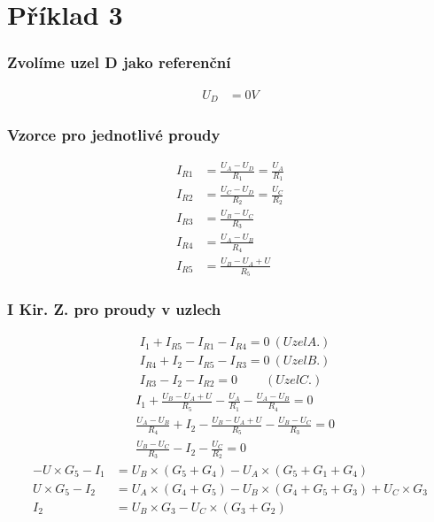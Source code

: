 \section{Příklad 3}
\subsubsection{Zvolíme uzel D jako referenční}
\begin{align*}
U_D &= 0 V
\end{align*}
\subsubsection{Vzorce pro jednotlivé proudy}
\begin{align*}
I_{R1} &= \frac {U_A - U_D} {R_1} = \frac {U_A} {R_1}\\
I_{R2} &= \frac {U_C - U_D} {R_2} = \frac {U_C} {R_2}\\
I_{R3} &= \frac {U_B - U_C} {R_3}\\
I_{R4} &= \frac {U_A - U_B} {R_4}\\
I_{R5} &= \frac {U_B - U_A + U} {R_5}
\end{align*}
\subsubsection{I Kir. Z. pro proudy v uzlech}
\begin{align*}
&I_1 + I_{R5} - I_{R1} - I_{R4} = 0~(Uzel A.)\\
&I_{R4} + I_2 - I_{R5} - I_{R3} = 0~(Uzel B.)\\
&I_{R3} - I_2 - I_{R2} = 0~~~~~~~~~~(Uzel C.)
\end{align*}
\begin{align*}
&I_1 + \frac {U_B - U_A + U} {R_5} - \frac {U_A} {R_1} - \frac {U_A - U_B} {R_4} = 0\\
&\frac {U_A - U_B}{R_4} + I_2 - \frac {U_B - U_A + U} {R_5} - \frac {U_B - U_C} {R_3} = 0\\
&\frac {U_B - U_C} {R_3} - I_2 - \frac {U_C} {R_2} = 0
\end{align*}
\begin{align*}
-U \times G_5 - I_1 &= U_B \times (G_5 + G_4) - U_A \times (G_5 + G_1 + G_4)\\
U \times G_5 - I_2 &= U_A \times (G_4 + G_5) - U_B \times (G_4 + G_5 + G_3) + U_C \times G_3\\
I_2 &= U_B \times G_3 - U_C \times (G_3 + G_2)
\end{align*}
